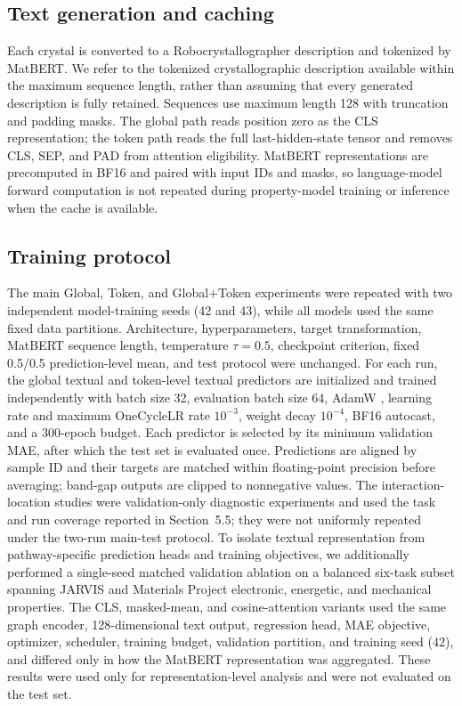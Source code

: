 \documentclass[a4paper,fleqn]{cas-sc}
\begin{document}
\subsection{Text generation and caching}
Each crystal is converted to a Robocrystallographer description and tokenized by MatBERT. We refer to the tokenized crystallographic description available within the maximum sequence length, rather than assuming that every generated description is fully retained. Sequences use maximum length 128 with truncation and padding masks. The global path reads position zero as the CLS representation; the token path reads the full last-hidden-state tensor and removes CLS, SEP, and PAD from attention eligibility. MatBERT representations are precomputed in BF16 and paired with input IDs and masks, so language-model forward computation is not repeated during property-model training or inference when the cache is available.

\subsection{Training protocol}
The main Global, Token, and Global+Token experiments were repeated with two independent model-training seeds (42 and 43), while all models used the same fixed data partitions. Architecture, hyperparameters, target transformation, MatBERT sequence length, temperature $\tau=0.5$, checkpoint criterion, fixed 0.5/0.5 prediction-level mean, and test protocol were unchanged. For each run, the global textual and token-level textual predictors are initialized and trained independently with batch size 32, evaluation batch size 64, AdamW \citep{loshchilov2019adamw}, learning rate and maximum OneCycleLR rate $10^{-3}$, weight decay $10^{-4}$, BF16 autocast, and a 300-epoch budget. Each predictor is selected by its minimum validation MAE, after which the test set is evaluated once. Predictions are aligned by sample ID and their targets are matched within floating-point precision before averaging; band-gap outputs are clipped to nonnegative values. The interaction-location studies were validation-only diagnostic experiments and used the task and run coverage reported in Section~5.5; they were not uniformly repeated under the two-run main-test protocol.
To isolate textual representation from pathway-specific prediction heads and training objectives, we additionally performed a single-seed matched validation ablation on a balanced six-task subset spanning JARVIS and Materials Project electronic, energetic, and mechanical properties. The CLS, masked-mean, and cosine-attention variants used the same graph encoder, 128-dimensional text output, regression head, MAE objective, optimizer, scheduler, training budget, validation partition, and training seed (42), and differed only in how the MatBERT representation was aggregated. These results were used only for representation-level analysis and were not evaluated on the test set.
\end{document}

